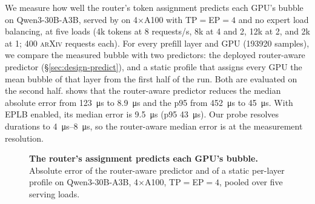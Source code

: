 We measure how well the router's token assignment predicts each GPU's
bubble on Qwen3-30B-A3B, served by \vllm on 4$\times$A100 with
\ac{TP}$=$\ac{EP}$=4$ and no expert load balancing, at five loads
(4k tokens at 8 requests/s, 8k at 4 and 2, 12k at 2, and 2k at 1;
400 \textsc{arXiv} requests each). For every prefill layer and GPU
(\num{193920} samples), we compare the measured bubble with two
predictors: the deployed router-aware predictor
(\S\ref{sec:design-predict}), and a static profile that assigns every
GPU the mean bubble of that layer from the first half of the run. Both
are evaluated on the second half.  shows that
the router-aware predictor reduces the median absolute error from
\SI{123}{\micro\second} to \SI{8.9}{\micro\second} and the p95 from
\SI{452}{\micro\second} to \SI{45}{\micro\second}. With \ac{EPLB}
enabled, its median error is \SI{9.5}{\micro\second} (p95
\SI{43}{\micro\second}). Our probe resolves durations to
\SIrange{4}{8}{\micro\second}, so the router-aware median error is at
the measurement resolution.

\begin{figure}[t]
  \centering
  \caption{\textbf{The router's assignment predicts each GPU's bubble.}
    Absolute error of the router-aware predictor and of a static
    per-layer profile on Qwen3-30B-A3B, 4$\times$A100,
    \ac{TP}$=$\ac{EP}$=4$, pooled over five serving loads.}
  \label{fig:appx-predict}
\end{figure}

